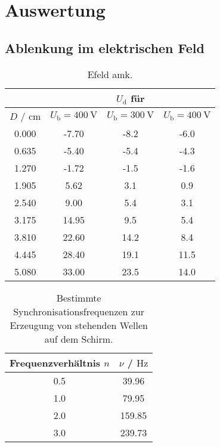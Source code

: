\section{Auswertung}
\label{sec:Auswertung}

\subsection{Ablenkung im elektrischen Feld}

\begin{table}
	\caption{Efeld amk.}
	\label{tab:efeldtab}
	\centering
	\begin{tabular}{cccc}
	\toprule
		& & $U_{\mathrm{d}}$ für & \\
		\midrule
		$D$ / \si{\centi\meter} & $U_{\mathrm{b}}=\SI{400}{\volt}$ & $U_{\mathrm{b}}=\SI{300}{\volt}$ & $U_{\mathrm{b}}=\SI{400}{\volt}$ \\
		\midrule
		0.000 & -7.70 & -8.2 & -6.0 \\
		0.635 & -5.40 & -5.4 & -4.3 \\
		1.270 & -1.72 & -1.5 & -1.6 \\
		1.905 & 5.62 & 3.1 & 0.9 \\
		2.540 & 9.00 & 5.4 & 3.1 \\
		3.175 & 14.95 & 9.5 & 5.4 \\
		3.810 & 22.60 & 14.2 & 8.4 \\
		4.445 & 28.40 & 19.1 & 11.5 \\
		5.080 & 33.00 & 23.5 & 14.0 \\
	\bottomrule
	\end{tabular}
\end{table}

\begin{table}
	\caption{Bestimmte Synchronisationsfrequenzen zur Erzeugung von stehenden Wellen auf dem Schirm.}
	\label{tab:saegen}
	\centering
	\begin{tabular}{cc}
	\toprule
		Frequenzverhältnis $n$ & $\nu$ / $\si{\hertz}$ \\
	\midrule
		0.5 & 39.96 \\
		1.0 & 79.95 \\
		2.0 & 159.85 \\
		3.0 & 239.73 \\
	\bottomrule
	\end{tabular}
\end{table}





